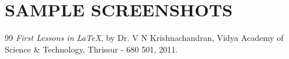 %
\chapter{SAMPLE SCREENSHOTS}
%
%
%
%
\clearpage
{}
%
%
\begin{thebibliography}{99}
%
{\em First Lessons in \LaTeX}, by Dr. V N Krishnachandran, 
Vidya Academy of Science \& Technology, 
Thrissur - 680 501, 2011.
%
\end{thebibliography}
%
%
%

%
%
%
%
